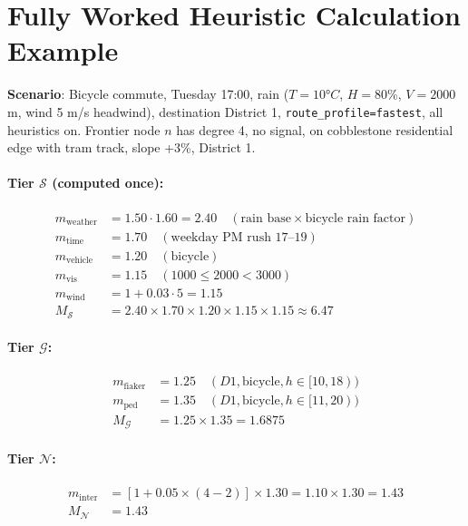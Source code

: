 \documentclass[11pt,a4paper]{article}
\begin{document}
\section{Fully Worked Heuristic Calculation Example}

\textbf{Scenario}: Bicycle commute, Tuesday 17:00, rain ($T=10°C$, $H=80\%$, $V=2000$ m, wind 5 m/s headwind), destination District 1, \texttt{route\_profile=fastest}, all heuristics on. Frontier node $n$ has degree 4, no signal, on cobblestone residential edge with tram track, slope +3\%, District 1.

\paragraph{Tier $\mathcal{S}$ (computed once):}
\begin{align*}
m_{\text{weather}} &= 1.50\cdot 1.60 = 2.40 \quad(\text{rain base} \times \text{bicycle rain factor})\\
m_{\text{time}}    &= 1.70 \quad(\text{weekday PM rush 17–19})\\
m_{\text{vehicle}} &= 1.20 \quad(\text{bicycle})\\
m_{\text{vis}}     &= 1.15 \quad(1000 \le 2000 < 3000)\\
m_{\text{wind}}    &= 1 + 0.03\cdot 5 = 1.15\\
M_{\mathcal{S}}    &= 2.40\times 1.70\times 1.20\times 1.15\times 1.15 \approx 6.47
\end{align*}

\paragraph{Tier $\mathcal{G}$:}
\begin{align*}
m_{\text{fiaker}}  &= 1.25 \quad(D1, \text{bicycle}, h\in[10,18))\\
m_{\text{ped}}     &= 1.35 \quad(D1, \text{bicycle}, h\in[11,20))\\
M_{\mathcal{G}}    &= 1.25\times 1.35 = 1.6875
\end{align*}

\paragraph{Tier $\mathcal{N}$:}
\begin{align*}
m_{\text{inter}} &= [1 + 0.05\times(4-2)]\times 1.30 = 1.10\times 1.30 = 1.43\\
M_{\mathcal{N}}  &= 1.43
\end{align*}
\end{document}
